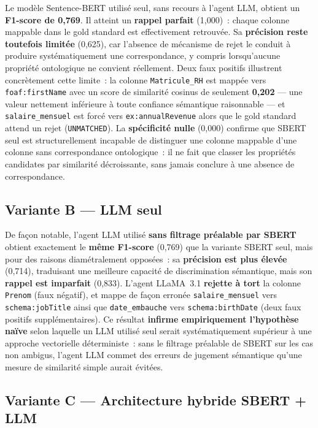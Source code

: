 Le modèle Sentence-BERT utilisé seul, sans recours à l'agent LLM,
obtient un \textbf{F1-score de 0,769}. Il atteint un \textbf{rappel
parfait} (1,000)~: chaque colonne mappable dans le gold standard est
effectivement retrouvée. Sa \textbf{précision reste toutefois limitée}
(0,625), car l'absence de mécanisme de rejet le conduit à produire
systématiquement une correspondance, y compris lorsqu'aucune propriété
ontologique ne convient réellement. Deux faux positifs illustrent
concrètement cette limite~: la colonne \texttt{Matricule\_RH} est
mappée vers \texttt{foaf:firstName} avec un score de similarité
cosinus de seulement \textbf{0,202} --- une valeur nettement inférieure
à toute confiance sémantique raisonnable --- et \texttt{salaire\_mensuel}
est forcé vers \texttt{ex:annualRevenue} alors que le gold standard
attend un rejet (\texttt{UNMATCHED}). La \textbf{spécificité nulle}
(0,000) confirme que SBERT seul est structurellement incapable de
distinguer une colonne mappable d'une colonne sans correspondance
ontologique~: il ne fait que classer les propriétés candidates par
similarité décroissante, sans jamais conclure à une absence de
correspondance.

\subsection{Variante B — LLM seul}
\label{subsec:ablation_b}

De façon notable, l'agent LLM utilisé \textbf{sans filtrage préalable
par SBERT} obtient exactement le \textbf{même F1-score} (0,769) que la
variante SBERT seul, mais pour des raisons diamétralement opposées~:
sa \textbf{précision est plus élevée} (0,714), traduisant une meilleure
capacité de discrimination sémantique, mais son \textbf{rappel est
imparfait} (0,833). L'agent LLaMA~3.1 \textbf{rejette à tort} la
colonne \texttt{Prenom} (faux négatif), et mappe de façon erronée
\texttt{salaire\_mensuel} vers \texttt{schema:jobTitle} ainsi que
\texttt{date\_embauche} vers \texttt{schema:birthDate} (deux faux
positifs supplémentaires). Ce résultat \textbf{infirme empiriquement
l'hypothèse naïve} selon laquelle un LLM utilisé seul serait
systématiquement supérieur à une approche vectorielle déterministe~:
sans le filtrage préalable de SBERT sur les cas non ambigus, l'agent
LLM commet des erreurs de jugement sémantique qu'une mesure de
similarité simple aurait évitées.

\subsection{Variante C — Architecture hybride SBERT + LLM}
\label{subsec:ablation_c}

